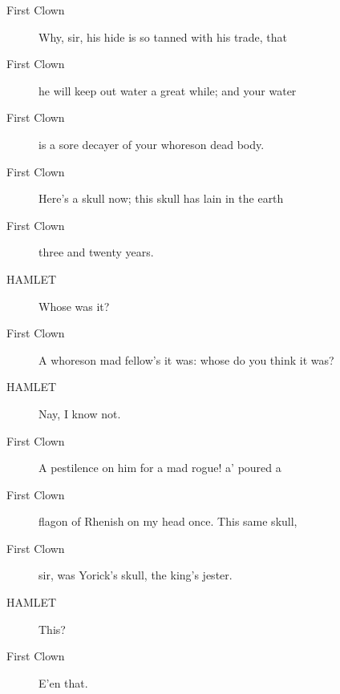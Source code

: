 \documentclass{article}
\begin{document}
\begin{description}
            
\item[First Clown] Why, sir, his hide is so tanned with his trade, that
\item[First Clown] he will keep out water a great while; and your water
\item[First Clown] is a sore decayer of your whoreson dead body.
\item[First Clown] Here's a skull now; this skull has lain in the earth
\item[First Clown] three and twenty years.
\end{description}
          
\begin{description}
            
\item[HAMLET] Whose was it?
\end{description}
          
\begin{description}
            
\item[First Clown] A whoreson mad fellow's it was: whose do you think it was?
\end{description}
          
\begin{description}
            
\item[HAMLET] Nay, I know not.
\end{description}
          
\begin{description}
            
\item[First Clown] A pestilence on him for a mad rogue! a' poured a
\item[First Clown] flagon of Rhenish on my head once. This same skull,
\item[First Clown] sir, was Yorick's skull, the king's jester.
\end{description}
          
\begin{description}
            
\item[HAMLET] This?
\end{description}
          
\begin{description}
            
\item[First Clown] E'en that.
\end{description}
          
\end{document}

